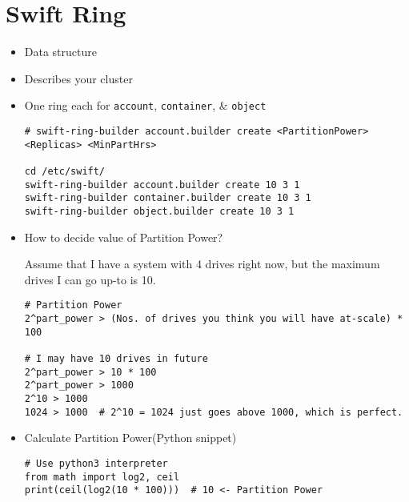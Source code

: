 \documentclass{article}
\begin{document}

\section{Swift Ring}
\label{sec-3}
\begin{itemize}
\item Data structure
\item Describes your cluster
\item One ring each for \texttt{account}, \texttt{container}, \& \texttt{object}
\begin{verbatim}
# swift-ring-builder account.builder create <PartitionPower> <Replicas> <MinPartHrs>

cd /etc/swift/
swift-ring-builder account.builder create 10 3 1
swift-ring-builder container.builder create 10 3 1
swift-ring-builder object.builder create 10 3 1
\end{verbatim}

\item How to decide value of Partition Power?

Assume that I have a system with 4 drives right now, but the
maximum drives I can go up-to is 10.
\begin{verbatim}
# Partition Power
2^part_power > (Nos. of drives you think you will have at-scale) * 100

# I may have 10 drives in future
2^part_power > 10 * 100
2^part_power > 1000
2^10 > 1000
1024 > 1000  # 2^10 = 1024 just goes above 1000, which is perfect.
\end{verbatim}

\item Calculate Partition Power(Python snippet)
\begin{verbatim}
# Use python3 interpreter
from math import log2, ceil
print(ceil(log2(10 * 100)))  # 10 <- Partition Power
\end{verbatim}
\end{itemize}
\end{document}
